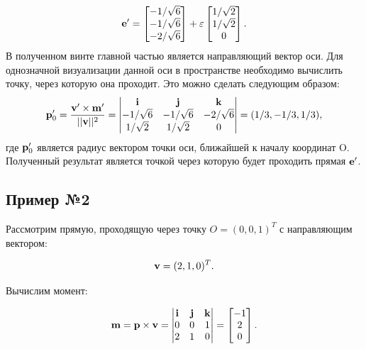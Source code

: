 \begin{equation*}
    \vb{e}'= 
    \begin{bmatrix}
        -1/\sqrt{6} \\
        -1/\sqrt{6} \\
        -2/\sqrt{6}
    \end{bmatrix}
    + \varepsilon
    \begin{bmatrix}
        1/\sqrt{2} \\
        1/\sqrt{2} \\
        0
    \end{bmatrix}.
\end{equation*}
В полученном винте главной частью является направляющий вектор оси. Для однозначной визуализации данной оси в пространстве необходимо вычислить точку,
через которую она проходит. Это можно сделать следующим образом:
\begin{equation*}
    \vb{p}^{\prime}_{0} = \frac{\vb{v}' \times \vb{m}'}{||\vb{v}||^2} 
    =
    \begin{vmatrix}
        \vb{i} & \vb{j} & \vb{k} \\
        -1/\sqrt{6} & -1/\sqrt{6} & -2/\sqrt{6} \\
        1/\sqrt{2} & 1/\sqrt{2} & 0
    \end{vmatrix}
    =(1/3, -1/3, 1/3),
\end{equation*}
где \(\vb{p}^{\prime}_{0}\) является радиус вектором точки оси, ближайшей к началу координат O.
Полученный результат является точкой через которую будет проходить прямая \(\vb{e}'\).

\subsection{Пример №2}

Рассмотрим прямую, проходящую через точку $O = (0, 0, 1)^T$ с направляющим вектором:

\begin{equation*}
    \vb{v} = (2, 1, 0)^T.
\end{equation*}

Вычислим момент:

\begin{equation*}
    \vb{m} = \vb{p} \times \vb{v} = 
    \begin{vmatrix}
        \vb{i} & \vb{j} & \vb{k} \\
        0 & 0 & 1 \\
        2 & 1 & 0
    \end{vmatrix}
    = 
    \begin{bmatrix}
        -1 \\
        2 \\
        0
    \end{bmatrix}.
\end{equation*}

